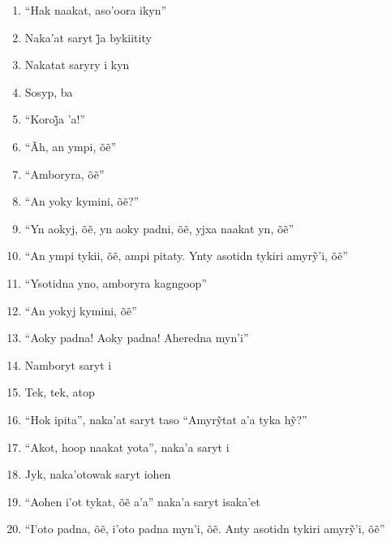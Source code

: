 \begin{enumerate}
 \item ``Hak naakat, aso'oora ikyn''

 \item Naka’at saryt j̃a bykiitity

 \item Nakatat saryry i kyn

 \item Sosyp, ba

 \item ``Koroj̃a ’a!''

 \item ``Ãh, an ympi, õẽ''

 \item ``Amboryra, õẽ''

 \item ``An yoky kymini, õẽ?''

 \item ``Yn aokyj, õẽ, yn aoky padni, õẽ, yjxa naakat yn, õẽ''

 \item ``An ympi tykii, õẽ, ampi pitaty. Ynty asotidn tykiri amyrỹ’i, õẽ''

 \item ``Ysotidna yno, amboryra kagngoop''

 \item ``An yokyj kymini, õẽ''

 \item ``Aoky padna! Aoky padna! Aheredna myn'i''

 \begin{center}\end{center}

 \item Namboryt saryt i

 \item Tek, tek, atop

 \item ``Hok ipita'', naka’at saryt taso ``Amyrỹtat a’a tyka hỹ?''

 \item ``Akot, hoop naakat yota'', naka'a saryt i

 \item Jyk, naka'otowak saryt iohen

 \item ``Aohen i’ot tykat, õẽ a’a'' naka’a saryt isaka’et

 \item ``I’oto padna, õẽ, i’oto padna myn’i, õẽ. Anty asotidn tykiri amyrỹ’i, õẽ''


\end{enumerate}
